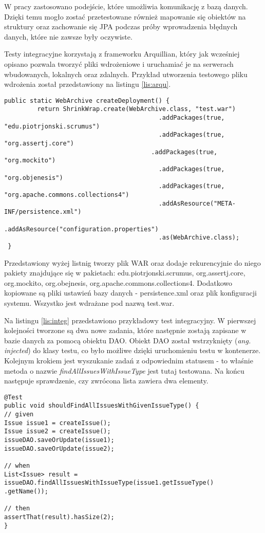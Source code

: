W pracy zastosowano podejście, które umożliwia komunikację z bazą danych. Dzięki temu mogło zostać przetestowane również mapowanie się obiektów na struktury oraz zachowanie się JPA podczas próby wprowadzenia błędnych danych, które nie zawsze były oczywiste.

Testy integracyjne korzystają z frameworku Arquillian, który jak wcześniej opisano pozwala tworzyć pliki wdrożeniowe i uruchamiać je na serwerach wbudowanych, lokalnych oraz zdalnych. Przykład utworzenia testowego pliku wdrożenia został przedstawiony na listingu \ref{lis:arqu}.

\begin{lstlisting}[caption={Przykład przygotowania pliku wdrożenia Arquillian}, label=lis:arqu, numbers=none]
 public static WebArchive createDeployment() {
		 return ShrinkWrap.create(WebArchive.class, "test.war")
										  .addPackages(true, "edu.piotrjonski.scrumus")
										  .addPackages(true, "org.assertj.core")
									   	.addPackages(true, "org.mockito")
										  .addPackages(true, "org.objenesis")
										  .addPackages(true, "org.apache.commons.collections4")
										  .addAsResource("META-INF/persistence.xml")
										  .addAsResource("configuration.properties")
										  .as(WebArchive.class);
 }\end{lstlisting}

Przedstawiony wyżej listnig tworzy plik WAR oraz dodaje rekurencyjnie do niego pakiety znajdujące się w pakietach: edu.piotrjonski.scrumus, org.assertj.core, org.mockito, org.obejnesis, org.apache.commons.collections4. Dodatkowo kopiowane są pliki ustawień bazy danych - persistence.xml oraz plik konfiguracji systemu. Wszystko jest wdrażane pod nazwą test.war.

Na listingu \ref{lis:integ} przedstawiono przykładowy test integracyjny. W pierwszej kolejności tworzone są dwa nowe zadania, które następnie zostają zapisane w bazie danych za pomocą obiektu DAO. Obiekt DAO został wstrzyknięty (\textit{ang. injected}) do klasy testu, co było możliwe dzięki uruchomieniu testu w kontenerze. Kolejnym krokiem jest wyszukanie zadań z odpowiednim statusem - to właśnie metoda o nazwie \textit{findAllIssuesWithIssueType} jest tutaj testowana. Na końcu następuje sprawdzenie, czy zwrócona lista zawiera dwa elementy.

\newpage
\begin{lstlisting}[caption={Przykład testu integracyjnego}, label=lis:integ, numbers=none]
@Test
public void shouldFindAllIssuesWithGivenIssueType() {
// given
Issue issue1 = createIssue();
Issue issue2 = createIssue();
issueDAO.saveOrUpdate(issue1);
issueDAO.saveOrUpdate(issue2);

// when
List<Issue> result = issueDAO.findAllIssuesWithIssueType(issue1.getIssueType()
.getName());

// then
assertThat(result).hasSize(2);
}\end{lstlisting}


